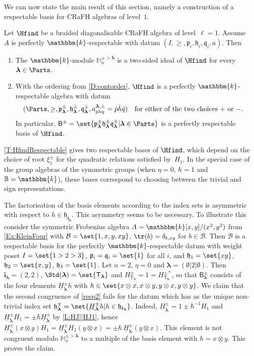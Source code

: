 \documentclass[a4paper,11pt]{amsart}
\newcommand\blam{{\boldsymbol\lambda}}
\newcommand\cB{\mathcal{B}}
\newcommand\bi{\mathbf{i}}
\newcommand\ilam[1][\blam]{\bi_{#1}}
\numberwithin{equation}{subsection}
\theoremstyle{definition}
\theoremstyle{theorem}
\theoremstyle{remark}
\newcommand\plam[1][\lambda]{\mathfrak{p}_{#1}}
\newcommand\hlam[1][\lambda]{\mathfrak{h}_{#1}}
\newcommand\qlam[1][\lambda]{\mathfrak{q}_{#1}}
\newcommand\HH{\mathbb{H}}
\newcommand\HJpm{\underline{H}^\pm}
\newcommand\Basis[1][\pm]{\mathsf{B}^{#1}}
\newcommand\Tlam[1][\blam]{{\mathsf{T}_{#1}}}
\newcommand\kk{\mathbbm{k}}
\newcommand{\Bo}{\mathbb{B}}
\begin{document}
  We can now state the main result of this section,
 namely a construction of a respectable basis for  CRaFH algebras of level~$1$.
  \begin{Theorem}\label{T:HfindRespectable}
   Let $\Hfind$ be a braided diagonalisable CRaFH algebra of
   level~$\ell=1$. Assume $A$ is perfectly $\kk$-respectable with datum
   $(I,\ge,\plam[i],\hlam[i],\qlam[i],a)$. Then
   \begin{enumerate}
   \item The $\kk$-module
   $\HH^{\pm>\blam}_n$ is a two-sided ideal of $\Hfind$ for every $\blam\in\Parts$.
   \item
     With the ordering from \autoref{D:contorder}, $\Hfind$ is a perfectly $\kk$-respectable algebra with datum
   \[(\Parts,\ge,\plam[\blam]^\pm,
   \hlam[\blam]^\pm,\qlam[\blam]^\pm,a^{\blam,\pm}_{phq}=\dot p\dot h\dot q)\quad\text{for either of the two choices $+$ or $-$.}
  \]
   In particular, $\Basis=\set{\plam[\blam]^\pm
   \hlam[\blam]^\pm\qlam[\blam]^\pm|\blam\in\Parts}$
   is a perfectly respectable basis of $\Hfind$.
   \end{enumerate}
 \end{Theorem}

\begin{Remark}\label{pmchoice}
 \autoref{T:HfindRespectable} gives two respectable bases of
 $\Hfind$, which depend on the choice of root $\xi^\pm_1$ for the
 quadratic relations satisfied by~$H_1$. In the special case of the group algebras of the
 symmetric groups (when $\eta=0$, $\hbar=1$ and $\Bo=\kk$), these bases
 correspond to choosing between the trivial and sign representations.
\end{Remark}

\begin{Remark}\label{R:RightAction} The factorisation of the basis elements according to the index sets is asymmetric with respect to $h\in\hlam[\ilam]$.  This asymmetry seems to be necessary.  To illustrate this consider the symmetric Frobenius algebra $A=\kk[x,y]/(x^2,y^2)$ from \autoref{Ex:KleinFour} with $\cB=\set{1, x, y, xy}$, $\tr(b)=\delta_{b,xy}$ for $b\in\cB$. Then $\cB$ is a respectable basis for the perfectly $\kk$-respectable datum with weight poset  $I=\set{1>2>3}$, $\plam[i]=\qlam[i]=\set{1}$ for all $i$, and
  $\hlam[1]=\set{xy}$, $\hlam[2]=\set{x,y}$, $\hlam[3]=\set{1}$. Let $n=2$, $\eta=0$ and
  $\blam=(\emptyset| 2|\emptyset)$. Then $\ilam=(2,2)$, $\Std(\blam)=\set{\Tlam}$ and
  $H^\pm_{\Tlam}=1=H^{\pm*}_{\Tlam}$, so that $\Basis_\blam$ consists of the four elements
  $\HJpm_\blam h$ with $h\in\set{x\otimes x,x\otimes y,y\otimes x,y\otimes y}$. We claim that the second congruence of \autoref{resp2} fails for the datum which has as the unique non-trivial index set
  $\hlam[\blam]^\pm=\set{\HJpm_\blam h|h\in\hlam[\ilam]}$. Indeed,
  $\HJpm_\blam=1\pm\hbar^{-1}H_1$ and $\HJpm_\blam H_1=\pm\hbar\HJpm_\blam$ by
  \autoref{L:HJ}\autoref{HJ1}, hence $\HJpm_\blam(x\otimes y)H_1=\HJpm_\blam H_1(y\otimes x)=\pm\hbar\,\HJpm_\blam(y\otimes x)$. This element  is not
  congruent modulo $\HH^{\pm>\blam}_n$ to a multiple of the basis element with $h=x\otimes y$.
  This proves the claim.
\end{Remark}
\end{document}
